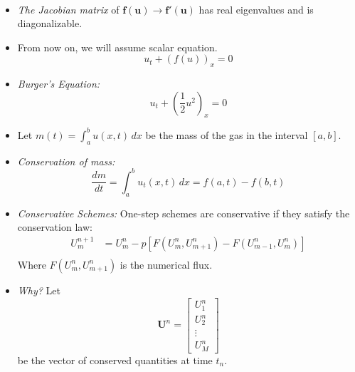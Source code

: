 \begin{itemize}
\begin{align*}
        \end{align*}
  \item \emph{The Jacobian matrix} of \(\symbf{f}(\symbf{u})\rightarrow \symbf{f}'(\symbf{u})\) has real eigenvalues and is diagonalizable.
  \item From now on, we will assume scalar equation.
        \[
          u_t + (f(u))_x = 0
        \]
  \item \emph{Burger's Equation:}
        \[
          u_t + (\frac{1}{2}u^2)_x = 0
        \]
  \item Let \(m(t)= \int_{a}^{b} u(x,t) \, dx\) be the mass of the gas in the interval \([a,b]\).
  \item \emph{Conservation of mass:}
        \[
          \frac{dm}{dt} = \int_{a}^{b} u_t(x,t) \, dx = f(a,t) - f(b,t) \tag{Boundary condition/flux}
        \]
  \item \emph{Conservative Schemes:} One-step schemes are conservative if they satisfy the conservation law:
        \begin{align*}
          U_m^{n+1} & = U_m^n - p \left[F(U_m^n, U_{m+1}^n) - F(U_{m-1}^n, U_m^n)\right] \\
        \end{align*}
        Where \(F(U_m^n, U_{m+1}^n)\) is the numerical flux.
  \item \emph{Why?} Let
        \[\symbf{U}^n = \begin{bmatrix}
            U_1^n  \\
            U_2^n  \\
            \vdots \\
            U_M^n
          \end{bmatrix}
        \]
        be the vector of conserved quantities at time \(t_n\).

        \begin{figure}[H]
          \centering
\end{figure}
\end{itemize}
